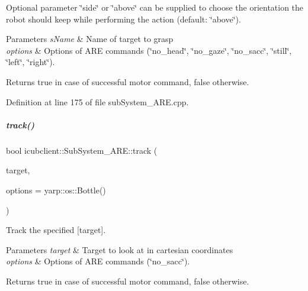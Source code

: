 Optional parameter \char`\"{}side\char`\"{} or \char`\"{}above\char`\"{} can be supplied to choose the orientation the robot should keep while performing the action (default\+: \char`\"{}above\char`\"{}). 
\begin{DoxyParams}{Parameters}
{\em s\+Name} & Name of target to grasp \\
\hline
{\em options} & Options of A\+RE commands (\char`\"{}no\+\_\+head\char`\"{}, \char`\"{}no\+\_\+gaze\char`\"{}, \char`\"{}no\+\_\+sacc\char`\"{}, \char`\"{}still\char`\"{}, \char`\"{}left\char`\"{}, \char`\"{}right\char`\"{}). \\
\hline
\end{DoxyParams}
\begin{DoxyReturn}{Returns}
true in case of successful motor command, false otherwise. 
\end{DoxyReturn}


Definition at line 175 of file sub\+System\+\_\+\+A\+R\+E.\+cpp.

\mbox{\label{group__icubclient__subsystems_adb9f502a08ee0aeb1c22b10b37def763}} 
\subparagraph{\texorpdfstring{track()}{track()}}
{\footnotesize\ttfamily bool icubclient\+::\+Sub\+System\+\_\+\+A\+R\+E\+::track (\begin{DoxyParamCaption}\item[{const yarp\+::sig\+::\+Vector\+Of$<$ double $>$ \&}]{target,  }\item[{const yarp\+::os\+::\+Bottle \&}]{options = {\ttfamily yarp\+:\+:os\+:\+:Bottle()} }\end{DoxyParamCaption})}



Track the specified \mbox{[}target\mbox{]}. 


\begin{DoxyParams}{Parameters}
{\em target} & Target to look at in cartesian coordinates \\
\hline
{\em options} & Options of A\+RE commands (\char`\"{}no\+\_\+sacc\char`\"{}). \\
\hline
\end{DoxyParams}
\begin{DoxyReturn}{Returns}
true in case of successful motor command, false otherwise. 
\end{DoxyReturn}


